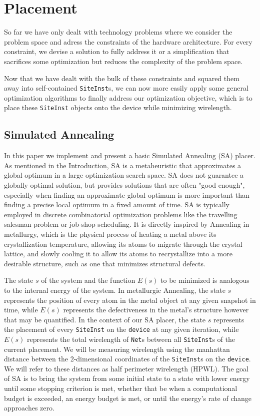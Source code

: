 
\section{Placement}
\label{sec:placement}
So far we have only dealt with technology problems where we consider the problem space and adress the constraints of the hardware architecture. 
For every constraint, we devise a solution to fully address it or a simplification that sacrifices some optimization but reduces the complexity of the problem space. 

Now that we have dealt with the bulk of these constraints and squared them away into self-contained \texttt{SiteInst}s, we can now more easily apply some general optimization algorithms to finally address our optimization objective, which is to place these \texttt{SiteInst} objects onto the device while minimizing wirelength. 

\subsection{Simulated Annealing}
\label{subsec:simulated_annealing}

In this paper we implement and present a basic Simulated Annealing (SA) placer. 
As mentioned in the Introduction, SA is a metaheuristic that approximates a global optimum in a large optimization search space. 
SA does not guarantee a globally optimal solution, but provides solutions that are often "good enough", especially when finding an approximate global optimum is more important than finding a precise local optimum in a fixed amount of time. 
SA is typically employed in discrete combinatorial optimization problems like the travelling salesman problem or job-shop scheduling. 
It is directly inspired by Annealing in metallurgy, which is the physical process of heating a metal above its crystallization temperature, allowing its atoms to migrate through the crystal lattice, and slowly cooling it to allow its atoms to recrystallize into a more desirable structure, such as one that minimizes structural defects. 

The state \(s\) of the system and the function \(E(s)\) to be minimized is analogous to the internal energy of the system. 
In metallurgic Annealing, the state \(s\) represents the position of every atom in the metal object at any given snapshot in time, while \(E(s)\) represents the defectiveness in the metal's structure however that may be quantified. 
In the context of our SA placer, the state \(s\) represents the placement of every \texttt{SiteInst} on the \texttt{device} at any given iteration, while \(E(s)\) represents the total wirelength of \texttt{Net}s between all \texttt{SiteInst}s of the current placement.
We will be measuring wirelength using the manhattan distance between the 2-dimensional coordinates of the \texttt{SiteInst}s on the \texttt{device}.
We will refer to these distances as half perimeter wirelength (HPWL).
The goal of SA is to bring the system from some initial state to a state with lower energy until some stopping criterion is met, whether that be when a computational budget is exceeded, an energy budget is met, or until the energy's rate of change approaches zero. 

